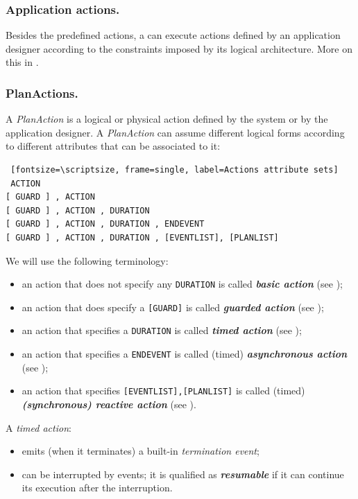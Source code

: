 \subsubsection{Application actions. }
Besides the predefined actions, a \qa{} can execute actions defined by an application designer according to the constraints imposed by its logical architecture. More on this in .

\subsubsection{PlanActions.}

A \textit{PlanAction} is a logical or physical action defined by the system or by the application designer. 
A \textit{PlanAction} can assume different logical forms according to different attributes that can be associated to it:

\begin{Verbatim} [fontsize=\scriptsize, frame=single, label=Actions attribute sets]
 ACTION 
[ GUARD ] , ACTION
[ GUARD ] , ACTION , DURATION
[ GUARD ] , ACTION , DURATION , ENDEVENT
[ GUARD ] , ACTION , DURATION , [EVENTLIST], [PLANLIST]
\end{Verbatim}


 We will use the following terminology:

\begin{itemize}
\item an action that does not specify any \texttt{DURATION} is  called \textit{\textbf{basic action}} (see );
\item an action that does specify a \texttt{[GUARD]} is  called \textit{\textbf{guarded action}} (see );
\item an action that specifies a \texttt{DURATION} is called \textit{\textbf{timed action}} (see );
\item an action that specifies a \texttt{ENDEVENT} is called (timed) \textit{\textbf{asynchronous action}} (see );
\item an action that specifies \texttt{[EVENTLIST],[PLANLIST]} is called (timed) \textit{\textbf{(synchronous) reactive action}} (see ).
\end{itemize}

 A \textit{timed action}: 
\begin{itemize}
\item emits (when it terminates) a built-in \textit{termination event};
\item can be interrupted by events; it is qualified as \textbf{\textit{resumable}} if it can continue its execution after the interruption.
\end{itemize}

